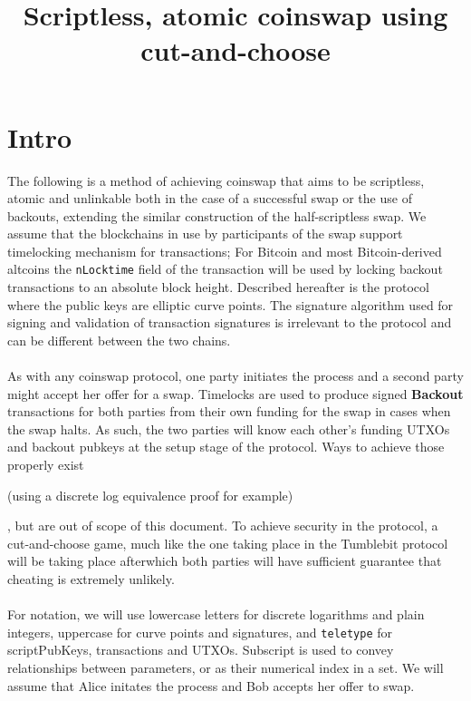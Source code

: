 \documentclass[12pt,a4paper]{article}
\title{Scriptless, atomic coinswap using cut-and-choose}
\date{\begin{tiny}version 0.1\end{tiny}}
\begin{document}
\maketitle
\section{Intro}
The following is a method of achieving coinswap that aims to be scriptless, atomic and unlinkable both in the case of a successful swap or the use of backouts, extending the similar construction of the half-scriptless swap\cite{hss}.  We assume that the blockchains in use by participants of the swap support timelocking mechanism for transactions; For Bitcoin and most Bitcoin-derived altcoins the \texttt{nLocktime} field of the transaction will be used by locking backout transactions to an absolute block height.  Described hereafter is the protocol where the public keys are elliptic curve points.  The signature algorithm used for signing and validation of transaction signatures is irrelevant to the protocol and can be different between the two chains.
\\
\\
As with any coinswap protocol, one party initiates the process and a second party might accept her offer for a swap.  Timelocks are used to produce signed \textbf{Backout} transactions for both parties from their own funding for the swap in cases when the swap halts.  As such, the two parties will know each other's funding UTXOs and backout pubkeys at the setup stage of the protocol.  Ways to achieve those properly exist \begin{tiny}(using a discrete log equivalence proof for example)\end{tiny}, but are out of scope of this document.  To achieve security in the protocol, a cut-and-choose \cite{cnc} game, much like the one taking place in the Tumblebit \cite{tumblebit} protocol will be taking place afterwhich both parties will have sufficient guarantee that cheating is extremely unlikely.
\\
\\
For notation, we will use lowercase letters for discrete logarithms and plain integers, uppercase for curve points and signatures, and \texttt{teletype} for scriptPubKeys, transactions and UTXOs.  Subscript is used to convey relationships between parameters, or as their numerical index in a set.
We will assume that Alice initates the process and Bob accepts her offer to swap.
\end{document}
